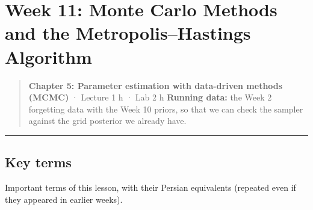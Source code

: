 \section{Week 11: Monte Carlo Methods and the Metropolis--Hastings
Algorithm}

\begin{quote}
\textbf{Chapter 5: Parameter estimation with data-driven methods (MCMC)}
· Lecture 1 h · Lab 2 h \textbf{Running data:} the Week 2 forgetting
data with the Week 10 priors, so that we can check the sampler against
the grid posterior we already have.
\end{quote}

\begin{center}\rule{0.5\linewidth}{0.5pt}\end{center}

\subsection{Key terms}

Important terms of this lesson, with their Persian equivalents (repeated
even if they appeared in earlier weeks).

